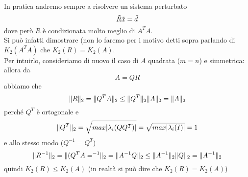 \documentclass[12pt,a4paper]{article}
\DeclarePairedDelimiter{\norma}{\lVert}{\rVert}
\begin{document}
In pratica andremo sempre a risolvere un sistema perturbato
\begin{equation*}
    \Tilde{R}\Tilde{x}=\Tilde{d}
\end{equation*}
dove però $R$ è condizionata molto meglio di $A^TA$. \\
Si può infatti dimostrare (non lo faremo per i motivo detti sopra parlando di $K_2(A^TA)$ che $K_2(R)=K_2(A)$. \\
Per intuirlo, consideriamo di nuovo il caso di $A$ quadrata ($m=n$) e simmetrica: allora da
\begin{equation*}
    A=QR
\end{equation*}
abbiamo che
\begin{equation*}
    \norma{R}_2 = \norma{Q^TA}_2 \leq \norma{Q^T}_2\norma{A}_2 = \norma{A}_2
\end{equation*}
perché $Q^T$ è ortogonale e 
\begin{equation*}
    \norma{Q^T}_2=\sqrt{max|\lambda_i(QQ^T)|}=\sqrt{max|\lambda_i(I)|}=1
\end{equation*}
e allo stesso modo ($Q^{-1}=Q^T$)
\begin{equation*}
    \norma{R^{-1}}_2 = \norma{(Q^TA=^{-1}}_2=\norma{A^{-1}Q}_2 \leq \norma{A^{-1}}_2\norma{Q}_2 = \norma{A^{-1}}_2 
\end{equation*}
quindi $K_2(R)\leq K_2(A)$ (in realtà si può dire che $K_2(R)=K_2(A)$)
\end{document}
